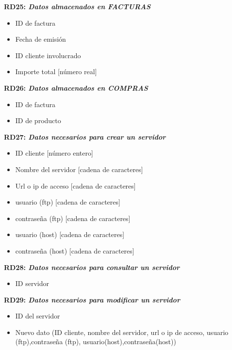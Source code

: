 \documentclass[paper=a4, fontsize=11pt, spanish]{scrartcl}
\begin{document}
	\setlength{\parindent}{0em}
	\textbf{RD25: \textit{Datos almacenados en FACTURAS}}
	\setlength{\parindent}{2em}
	\begin{itemize}
		\item ID de factura
		\item Fecha de emisión
		\item ID cliente involucrado
		\item Importe total [número real]
	\end{itemize}

	\setlength{\parindent}{0em}
	\textbf{RD26: \textit{Datos almacenados en COMPRAS}}
	\setlength{\parindent}{2em}
	\begin{itemize}
		\item ID de factura
		\item ID de producto
	\end{itemize}

\setlength{\parindent}{0em}
\textbf{RD27: \textit{Datos necesarios para crear un servidor}}
\setlength{\parindent}{2em}
\begin{itemize}
  \item ID cliente [número entero]
  \item Nombre del servidor [cadena de caracteres]
  \item Url o ip de acceso [cadena de caracteres]
  \item usuario (ftp) [cadena de caracteres]
  \item contraseña (ftp) [cadena de caracteres]
  \item usuario (host) [cadena de caracteres]
  \item contraseña (host) [cadena de caracteres]
\end{itemize}

\setlength{\parindent}{0em}
\textbf{RD28: \textit{Datos necesarios para consultar un servidor}}
\setlength{\parindent}{2em}
\begin{itemize}
  \item ID servidor
\end{itemize}

\setlength{\parindent}{0em}
\textbf{RD29: \textit{Datos necesarios para modificar un servidor}}
\setlength{\parindent}{2em}
\begin{itemize}
  \item ID del servidor
  \item Nuevo dato (ID cliente, nombre del servidor, url o ip de acceso, usuario (ftp),contraseña (ftp), usuario(host),contraseña(host))
\end{itemize}
\end{document}
